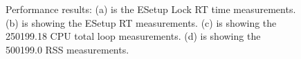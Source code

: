 \documentclass[12pt]{iopart}
\begin{document}
\begin{figure}
\begin{minipage}{.48\textwidth}
\end{minipage}
\begin{minipage}{.48\textwidth}
\end{minipage}\hfill
\begin{minipage}{.48\textwidth}
 \end{minipage}
 \caption{Performance results: (a) is the ESetup Lock RT time measurements. (b) is showing the ESetup RT  measurements. (c) is showing the 250199.18 CPU total loop measurements. (d) is showing the 500199.0 RSS measurements.}
\label{fig:performance1}
\end{figure}
 
\end{document}
